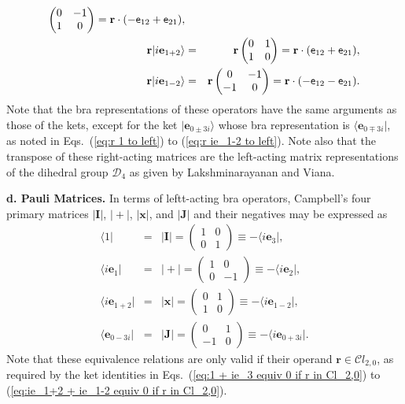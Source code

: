 \documentclass[11pt,twocolumn]{article}
\begin{document}
\begin{eqnarray}
\begin{pmatrix}
0&-1\\
1&0
\end{pmatrix}
=\mathbf r\cdot(-\textsf e_{12}+\textsf e_{21}),\\
\label{eq:r ie_1+2 matrix}
\mathbf r|i\mathbf e_{1+2}\rangle&=&\mathbf r
\begin{pmatrix}
0&1\\
1&0
\end{pmatrix}
=\mathbf r\cdot(\textsf e_{12}+\textsf e_{21}),\\
\label{eq:r ie_1-2 matrix}
\mathbf r|i\mathbf e_{1-2}\rangle&=&\mathbf r
\begin{pmatrix}
0&-1\\
-1&0
\end{pmatrix}
=\mathbf r\cdot(-\textsf e_{12}-\textsf e_{21}).
\end{eqnarray}
Note that the bra representations of these operators have the same arguments as those of the kets, except for the ket $|\mathbf e_{0\pm3i}\rangle$ whose bra representation is $\langle\mathbf e_{0\mp3i}|$, as noted in Eqs.~(\ref{eq:r 1 to left}) to (\ref{eq:r ie_1-2 to left}).   Note also that the transpose of these right-acting matrices are the left-acting matrix representations of the dihedral group $\mathcal D_4$ as given by Lakshminarayanan and Viana\cite{LakshminarayananViana_2005_josaa22i11pp2483-2489_p2484}.

\textbf{d. Pauli Matrices.}  In terms of leftt-acting bra operators, Campbell's four primary matrices $|\mathbf I|$, $|\!+\!|$, $|\mathbf x|$, and $|\mathbf J|$ and their negatives may be expressed as\cite{Campbell_1997_OptomVisSci74i6pp381-387_p383}
\begin{eqnarray}
\label{eq:1 is I}
\langle 1|&=&|\mathbf I|=
\begin{pmatrix}
1&0\\
0&1
\end{pmatrix}
\equiv-\langle i\mathbf e_3|,\\
\label{eq:ie_1 is +}
\langle i\mathbf e_1|&=&|\!+\!|=
\begin{pmatrix}
1&0\\
0&-1
\end{pmatrix}
\equiv-\langle i\mathbf e_2|,\\
\label{eq:ie_1+2 is x}
\langle i\mathbf e_{1+2}|&=&|\mathbf x|=
\begin{pmatrix}
0&1\\
1&0
\end{pmatrix}
\equiv-\langle i\mathbf e_{1-2}|,\\
\label{eq:ie_0-3i is J}
\langle \mathbf e_{0-3i}|&=&|\mathbf J|=
\begin{pmatrix}
0&1\\
-1&0
\end{pmatrix}
\equiv-\langle i\mathbf e_{0+3i}|.
\end{eqnarray}
Note that these equivalence relations are only valid if their operand $\mathbf r\in\mathcal Cl_{2,0}$, as required by the ket identities in Eqs.~(\ref{eq:1 + ie_3 equiv 0 if r in Cl_2,0}) to (\ref{eq:ie_1+2 + ie_1-2 equiv 0 if r in Cl_2,0}).
\end{document}
